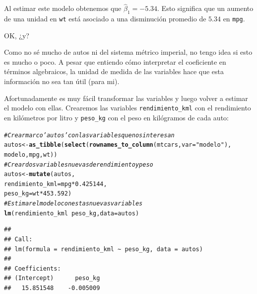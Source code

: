 \documentclass[12pt]{report}\usepackage[]{graphicx}\usepackage[]{color}
\makeatletter
\newcommand{\hlnum}[1]{\textcolor[rgb]{0.686,0.059,0.569}{#1}}%
\newcommand{\hlstr}[1]{\textcolor[rgb]{0.192,0.494,0.8}{#1}}%
\newcommand{\hlcom}[1]{\textcolor[rgb]{0.678,0.584,0.686}{\textit{#1}}}%
\newcommand{\hlopt}[1]{\textcolor[rgb]{0,0,0}{#1}}%
\newcommand{\hlstd}[1]{\textcolor[rgb]{0.345,0.345,0.345}{#1}}%
\newcommand{\hlkwb}[1]{\textcolor[rgb]{0.69,0.353,0.396}{#1}}%
\newcommand{\hlkwc}[1]{\textcolor[rgb]{0.333,0.667,0.333}{#1}}%
\newcommand{\hlkwd}[1]{\textcolor[rgb]{0.737,0.353,0.396}{\textbf{#1}}}%
\newenvironment{kframe}{%
 \def\at@end@of@kframe{}%
 \ifinner\ifhmode%
  \def\at@end@of@kframe{\end{minipage}}%
  \begin{minipage}{\columnwidth}%
 \fi\fi%
 \def\FrameCommand##1{\hskip\@totalleftmargin \hskip-\fboxsep
 \colorbox{shadecolor}{##1}\hskip-\fboxsep
     \hskip-\linewidth \hskip-\@totalleftmargin \hskip\columnwidth}%
 \MakeFramed {\advance\hsize-\width
   \@totalleftmargin\z@ \linewidth\hsize
   \@setminipage}}%
 {\par\unskip\endMakeFramed%
 \at@end@of@kframe}
\newenvironment{knitrout}{}{} %
\makeatother
\begin{document}
Al estimar este modelo obtenemos que $\hat\beta_1 = -5.34$. Esto significa que un aumento de una unidad en \verb|wt| está asociado a una disminución promedio de $5.34$ en \verb|mpg|.

OK, ¿y?

Como no sé mucho de autos ni del sistema métrico imperial, no tengo idea si esto es mucho o poco.
A pesar que entiendo cómo interpretar el coeficiente en términos algebraicos, la unidad de medida de las variables hace que esta información no sea tan útil (para mi).

Afortunadamente es muy fácil transformar las variables y luego volver a estimar el modelo con ellas. Crearemos las variables \verb|rendimiento_kml| con el rendimiento en kilómetros por litro y \verb|peso_kg| con el peso en kilógramos de cada auto:

\begin{knitrout}
\color{fgcolor}\begin{kframe}
\begin{alltt}
\hlcom{# Crear marco 'autos' con las variables que nos interesan}
\hlstd{autos} \hlkwb{<-} \hlkwd{as_tibble}\hlstd{(}\hlkwd{select}\hlstd{(}\hlkwd{rownames_to_column}\hlstd{(mtcars,} \hlkwc{var} \hlstd{=} \hlstr{"modelo"}\hlstd{),}
                          \hlstd{modelo, mpg, wt))}
\hlcom{# Crear dos variables nuevas de rendimiento y peso}
\hlstd{autos} \hlkwb{<-} \hlkwd{mutate}\hlstd{(autos,}
                \hlkwc{rendimiento_kml} \hlstd{=  mpg} \hlopt{*} \hlnum{0.425144}\hlstd{,}
                \hlkwc{peso_kg} \hlstd{= wt} \hlopt{*} \hlnum{453.592}\hlstd{)}
\hlcom{# Estimar el modelo con estas nuevas variables}
\hlkwd{lm}\hlstd{(rendimiento_kml} \hlopt{~} \hlstd{peso_kg,} \hlkwc{data} \hlstd{= autos)}
\end{alltt}
\begin{verbatim}
## 
## Call:
## lm(formula = rendimiento_kml ~ peso_kg, data = autos)
## 
## Coefficients:
## (Intercept)      peso_kg  
##   15.851548    -0.005009
\end{verbatim}
\end{kframe}
\end{knitrout}
\end{document}
